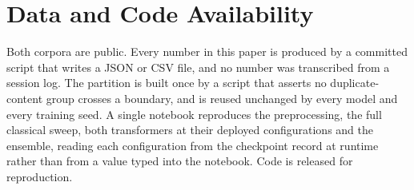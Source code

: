 \documentclass[conference,a4paper]{IEEEtran}
\begin{document}
\section*{Data and Code Availability}
Both corpora are public. Every number in this paper is produced by a committed script that writes a JSON or CSV file, and no number was transcribed from a session log. The partition is built once by a script that asserts no duplicate-content group crosses a boundary, and is reused unchanged by every model and every training seed. A single notebook reproduces the preprocessing, the full classical sweep, both transformers at their deployed configurations and the ensemble, reading each configuration from the checkpoint record at runtime rather than from a value typed into the notebook. Code is released for reproduction.

\balance


\end{document}
